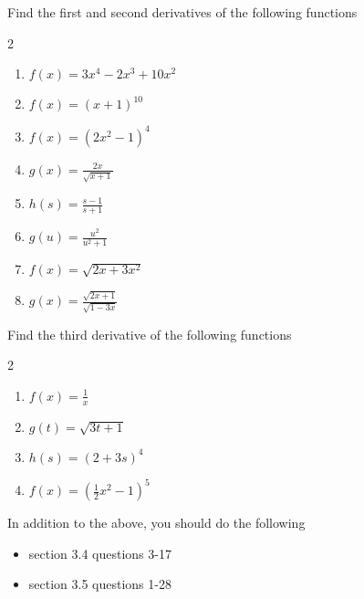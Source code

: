 \documentclass[12pt,letterpaper]{article}
\newenvironment{problem}[2][Problem]{\begin{trivlist}
\item[\hskip \labelsep {\bfseries #1}\hskip \labelsep {\bfseries #2.}]}{\end{trivlist}}
\newenvironment{sol}
    {\emph{Solution:}
    }
    {
    \qed
    }
\begin{document}



\begin{problem}{1}
Find the first and second derivatives of the following functions
\begin{multicols}{2}
  \begin{enumerate}[label=\roman*)]
  \item $ f(x) = 3x^4-2x^3 + 10 x^2 $
  \item $ f(x) = (x+1)^{10}$
  \item $ f(x) = (2x^2-1)^4$
  \item $ g(x) = \displaystyle\frac{2x}{\sqrt{x+1}}$
  \item $h(s) = \displaystyle\frac{s-1}{s+1}$
  \item $g(u) = \displaystyle\frac{u^2}{u^2+1}$
  \item $f(x) = \sqrt{2x+3x^2}$
  \item $g(x) = \displaystyle\frac{\sqrt{2x+1}}{\sqrt{1-3x}}$
  \end{enumerate}
\end{multicols}
\end{problem}

\begin{problem}{2}
Find the third derivative of the following functions
\begin{multicols}{2}
  \begin{enumerate}[label=\roman*)]
  \item $\displaystyle f(x) = \frac{1}{x}$
  \item $ \displaystyle g(t) = \sqrt{3t+1}$
  \item $\displaystyle h(s) = (2+3s)^4$
    \item $\displaystyle f(x) = (\frac{1}{2}x^2-1)^5$
  \end{enumerate}
\end{multicols}
\end{problem}


\noindent In addition to the above, you should do the following
\begin{itemize}
\item section 3.4 questions 3-17
\item section 3.5 questions 1-28
  
\end{itemize}


\end{document}
